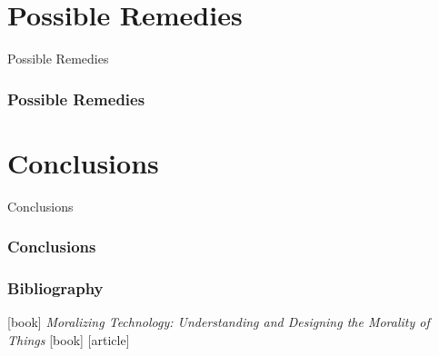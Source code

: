 \documentclass{beamer}
\begin{document}
\section{Possible Remedies}

\begin{frame}
\begin{center} 
	 Possible Remedies
\end{center}
\end{frame}

\begin{frame}
\frametitle{Possible Remedies}

\end{frame}

\section{Conclusions}

\begin{frame}
\begin{center} 
	 Conclusions
\end{center}
\end{frame}

\begin{frame}
\frametitle{Conclusions}
\end{frame}

\begin{frame}
\frametitle{Bibliography}
\begin{thebibliography}{9}
	[book]
	\textit{Moralizing Technology: Understanding and Designing the Morality of Things}
	[book]
	[article]

\end{thebibliography}
\end{frame}
\end{document}
